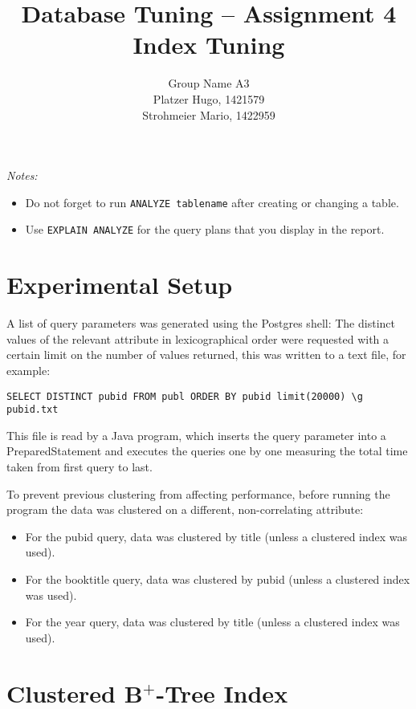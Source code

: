 \documentclass[11pt]{scrartcl}
\title{
  \textbf{\large Database Tuning -- Assignment 4}\\
  Index Tuning
}
\author{
 Group Name A3\\
 \large Platzer Hugo, 1421579 \\
 \large Strohmeier Mario, 1422959 \\
}
\begin{document}
\maketitle

\noindent
{\it Notes:}
\begin{itemize}\itemsep=0pt
\item Do not forget to run {\tt ANALYZE tablename} after creating or
  changing a table.
\item Use {\tt EXPLAIN ANALYZE} for the query plans that you display in the report.
\end{itemize}


\section{Experimental Setup}

A list of query parameters was generated using the Postgres shell:
The distinct values of the relevant attribute in lexicographical order were
requested with a certain limit on the number of values returned, this was written
to a text file, for example:

{\small
\begin{verbatim}
SELECT DISTINCT pubid FROM publ ORDER BY pubid limit(20000) \g pubid.txt
\end{verbatim}
}


This file is read by a Java program, which inserts the query parameter
into a PreparedStatement and executes the queries one by one measuring the total
time taken from first query to last.

\smallskip
To prevent previous clustering from affecting performance, before running the
program the data was clustered on a different, non-correlating attribute:

\begin{itemize}
\item
For the pubid query, data was clustered by title (unless a clustered index was used).
\item
For the booktitle query, data was clustered by pubid (unless a clustered index was used).
\item
For the year query, data was clustered by title (unless a clustered index was used).
\end{itemize}

\section{Clustered B$^+$-Tree Index}
\end{document}
